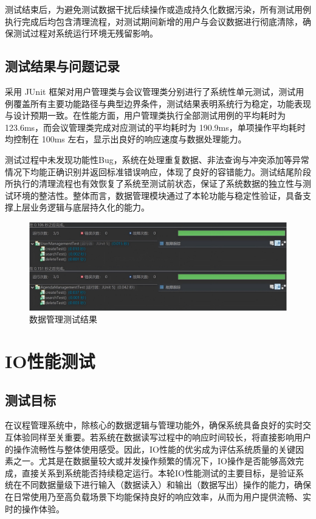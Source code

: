 \documentclass[a4paper, twoside, utf8]{ctexart}
\begin{document}
    测试结束后，为避免测试数据干扰后续操作或造成持久化数据污染，所有测试用例执行完成后均包含清理流程，对测试期间新增的用户与会议数据进行彻底清除，确保测试过程对系统运行环境无残留影响。

    \subsection{测试结果与问题记录}

    采用 JUnit 框架对用户管理类与会议管理类分别进行了系统性单元测试，测试用例覆盖所有主要功能路径与典型边界条件，测试结果表明系统行为稳定，功能表现与设计预期一致。在性能方面，用户管理类执行全部测试用例的平均耗时为 123.6ms，而会议管理类完成对应测试的平均耗时为 190.9ms，单项操作平均耗时均控制在 100ms 左右，显示出良好的响应速度与数据处理能力。

    测试过程中未发现功能性Bug，系统在处理重复数据、非法查询与冲突添加等异常情况下均能正确识别并返回标准错误响应，体现了良好的容错能力。测试结尾阶段所执行的清理流程也有效恢复了系统至测试前状态，保证了系统数据的独立性与测试环境的整洁性。整体而言，数据管理模块通过了本轮功能与稳定性验证，具备支撑上层业务逻辑与底层持久化的能力。

    \begin{figure}[htbp]
        \centering
        \includegraphics[width=.9\linewidth]{figure/ManagementTest.png}
        \caption{数据管理测试结果}
    \end{figure}

    \section{IO性能测试}

    \subsection{测试目标}

    在议程管理系统中，除核心的数据逻辑与管理功能外，确保系统具备良好的实时交互体验同样至关重要。若系统在数据读写过程中的响应时间较长，将直接影响用户的操作流畅性与整体使用感受。因此，IO性能的优劣成为评估系统质量的关键因素之一。尤其是在数据量较大或并发操作频繁的情况下，IO操作是否能够高效完成，直接关系到系统能否持续稳定运行。本轮IO性能测试的主要目标，是验证系统在不同数据量级下进行输入（数据读入）和输出（数据写出）操作的能力，确保在日常使用乃至高负载场景下均能保持良好的响应效率，从而为用户提供流畅、实时的操作体验。
    
\end{document}
